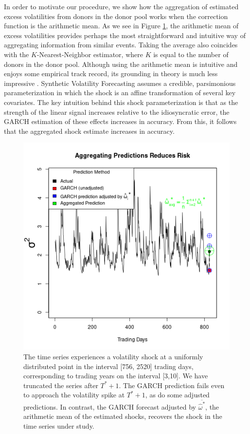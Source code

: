 \documentclass[11pt]{article}
\theoremstyle{definition}
\begin{document}
In order to motivate our procedure, we show how the aggregation of estimated excess volatilities from donors in the donor pool works when the correction function is the arithmetic mean.  As we see in Figure \ref{fig:arith_mean_example_introduction}, the arithmetic mean of excess volatilities provides perhaps the most straightforward and intuitive way of aggregating information from similar events.  Taking the average also coincides with the $K$-Nearest-Neighbor estimator, where $K$ is equal to the number of donors in the donor pool. Although using the arithmetic mean is intuitive and enjoys some empirical track record, its grounding in theory is much less impressive \citep{timmermann2006forecast}.  Synthetic Volatility Forecasting assumes a credible, parsimonious parameterization in which the shock is an affine transformation of several key covariates.  The key intuition behind this shock parameterization is that as the strength of the linear signal increases relative to the idiosyncratic error, the GARCH estimation of these effects increases in accuracy.  From this, it follows that the aggregated shock estimate increases in accuracy. 

  \begin{figure}[h]
    \begin{center}
      \includegraphics[scale=.7]{simulation_plots/USE_in_paper_simulation_plot_arithmetic_mean.png}
      \caption{The time series experiences a volatility shock at a uniformly distributed point in the interval [756, 2520] trading days, corresponding to trading years on the interval [3,10].  We have truncated the series after $T^{*}+1$.  The GARCH prediction fails even to approach the volatility spike at $T^{*}+1$, as do some adjusted predictions.  In contrast, the GARCH forecast adjusted by $\overline{\hat\omega^{*}}$, the arithmetic mean of the estimated shocks, recovers the shock in the time series under study.} 
      \label{fig:arith_mean_example_introduction}
      \end{center}
    \end{figure}
\end{document}
